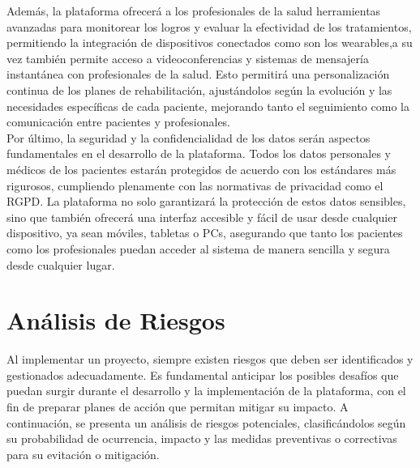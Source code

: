 \documentclass{article}
\begin{document}
Además, la plataforma ofrecerá a los profesionales de la salud herramientas avanzadas para monitorear los logros y evaluar la efectividad de los tratamientos, permitiendo la  integración de dispositivos conectados como son los wearables,a su vez también permite acceso a videoconferencias y sistemas de mensajería instantánea con profesionales de la salud. Esto permitirá una personalización continua de los planes de rehabilitación, ajustándolos según la evolución y las necesidades específicas de cada paciente, mejorando tanto el seguimiento como la comunicación entre pacientes y profesionales.
\\

Por último, la seguridad y la confidencialidad de los datos serán aspectos fundamentales en el desarrollo de la plataforma. Todos los datos personales y médicos de los pacientes estarán protegidos de acuerdo con los estándares más rigurosos, cumpliendo plenamente con las normativas de privacidad como el RGPD. La plataforma no solo garantizará la protección de estos datos sensibles, sino que también ofrecerá una interfaz accesible y fácil de usar desde cualquier dispositivo, ya sean móviles, tabletas o PCs, asegurando que tanto los pacientes como los profesionales puedan acceder al sistema de manera sencilla y segura desde cualquier lugar.
	
	
	\section{Análisis de Riesgos}
	
	Al implementar un proyecto, siempre existen riesgos que deben ser identificados y gestionados adecuadamente. Es fundamental anticipar los posibles desafíos que puedan surgir durante el desarrollo y la implementación de la plataforma, con el fin de preparar planes de acción que permitan mitigar su impacto. A continuación, se presenta un análisis de riesgos potenciales, clasificándolos según su probabilidad de ocurrencia, impacto y las medidas preventivas o correctivas para su evitación o mitigación.
	
\end{document}
